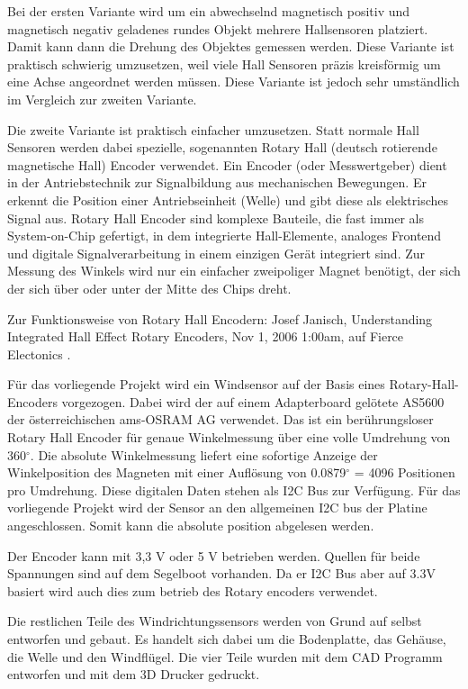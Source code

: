 Bei der ersten Variante wird um ein abwechselnd magnetisch positiv und magnetisch negativ geladenes rundes Objekt mehrere Hallsensoren platziert. Damit kann dann die Drehung des Objektes gemessen werden. Diese Variante ist praktisch schwierig umzusetzen, weil viele Hall Sensoren präzis kreisförmig um eine Achse angeordnet werden müssen. Diese Variante ist jedoch sehr umständlich im Vergleich zur zweiten Variante.

Die zweite Variante ist praktisch einfacher umzusetzen. Statt normale Hall Sensoren werden dabei spezielle, sogenannten Rotary Hall (deutsch rotierende magnetische Hall) Encoder verwendet. Ein Encoder (oder Messwertgeber) dient in der Antriebstechnik zur Signalbildung aus mechanischen Bewegungen. Er erkennt die Position einer Antriebseinheit (Welle) und gibt diese als elektrisches Signal aus. \cite{noauthor_was_nodate} Rotary Hall Encoder sind komplexe Bauteile, die fast immer als System-on-Chip gefertigt, in dem integrierte Hall-Elemente, analoges Frontend und digitale Signalverarbeitung in einem einzigen Gerät integriert sind. Zur Messung des Winkels wird nur ein einfacher zweipoliger Magnet benötigt, der sich der sich über oder unter der Mitte des Chips dreht.

Zur Funktionsweise von Rotary Hall Encodern: Josef Janisch, Understanding Integrated Hall Effect Rotary Encoders, Nov 1, 2006 1:00am, auf Fierce Electonics \cite{janisch_understanding_2006}.

Für das vorliegende Projekt wird ein Windsensor auf der Basis eines Rotary-Hall-Encoders vorgezogen. Dabei wird der auf einem Adapterboard gelötete AS5600 der österreichischen ams-OSRAM AG verwendet. Das ist ein berührungsloser Rotary Hall Encoder für genaue Winkelmessung über eine volle Umdrehung von 360$^\circ$.  Die absolute Winkelmessung liefert eine sofortige Anzeige der Winkelposition des Magneten mit einer Auflösung von 0.0879$^\circ$ = 4096 Positionen pro Umdrehung. Diese digitalen Daten stehen als I2C Bus zur Verfügung. Für das vorliegende Projekt wird der Sensor an den allgemeinen I2C bus der Platine angeschlossen. Somit kann die absolute position abgelesen werden. 

Der Encoder kann mit 3,3 V oder 5 V betrieben werden. Quellen für beide Spannungen sind auf dem Segelboot vorhanden. Da er I2C Bus aber auf 3.3V basiert wird auch dies zum betrieb des Rotary encoders verwendet.

Die restlichen Teile des Windrichtungssensors werden von Grund auf selbst entworfen und gebaut. Es handelt sich dabei um die Bodenplatte, das Gehäuse, die Welle und den Windflügel. Die vier Teile wurden mit dem CAD Programm entworfen und mit dem 3D Drucker gedruckt.

